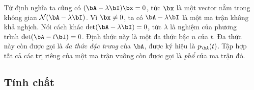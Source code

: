 

Từ định nghĩa ta cũng có $(\bA - \lambda \bI)\bx = 0$, tức $\bx$ là một vector nằm trong không gian $\mathcal{N}(\bA - \lambda \bI)$. Vì $\bx \neq 0$, ta có  $\bA - \lambda \bI$ là một ma
trận không khả nghịch. Nói cách khác $\det(\bA - \lambda \bI) = 0$, tức
$\lambda$ là nghiệm của phương trình $\det(\bA -t \bI) = 0$.
Định thức này là một đa thức bậc $n$ của $t$. Đa thức này còn được gọi là
\textit{đa thức đặc trưng} của $\bA$, được ký hiệu là $p_{\bA}(t)$. Tập hợp tất
cả các trị riêng của một ma trận vuông còn được gọi là \textit{phổ} của ma trận
đó.



\subsection{Tính chất} %
\label{sub:tinh_chat}








